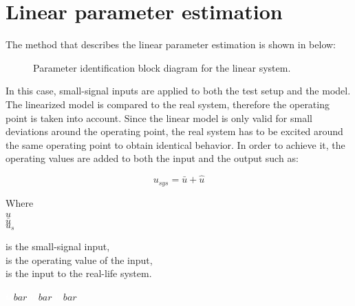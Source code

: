 \section{Linear parameter estimation} 
\label{LinParamEst}


The method that describes the linear parameter estimation is shown in  below:

\begin{figure}[H]
\centering
 
\caption{Parameter identification block diagram for the linear system. }
\label{fig:parame_block_lin}
\end{figure}

In this case, small-signal inputs are applied to both the test setup and the model. The linearized model is compared to the real system, therefore the operating point is taken into account. Since the linear model is only valid for small deviations around the operating point, the real system has to be excited around the same operating point to obtain identical behavior. In order to achieve it, the operating values are added to both the input and the output such as: 

\begin{equation}
u_{sys} = \bar{u} + \hat{u}
 \label{u_smallsignal}
\end{equation}

\begin{minipage}[t]{0.20\textwidth}
Where\\
\hspace*{8mm} $\hat{u}$ \\
\hspace*{8mm} $\bar{u}$ \\
\hspace*{8mm} $u_{s}$ 
\end{minipage}
\begin{minipage}[t]{0.68\textwidth}
\vspace*{2mm}
is the small-signal input, \\
is the operating value of the input,\\
is the input to the real-life system. 
\end{minipage}
\begin{minipage}[t]{0.10\textwidth}
\vspace*{2mm}
\textcolor{White}{te}$\unit{bar}$
\textcolor{White}{te}$\unit{bar}$
\textcolor{White}{te}$\unit{bar}$
\end{minipage} 

